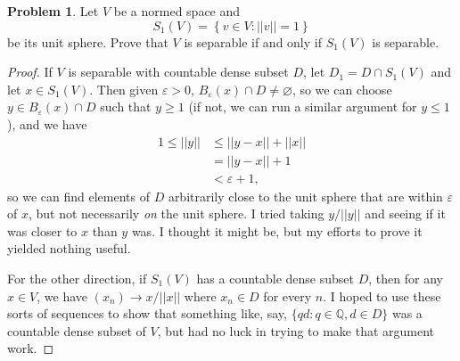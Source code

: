 \documentclass[12pt]{article}
\theoremstyle{definition}
\newtheorem{ex}{Problem}
\begin{document}
\begin{ex}
	Let $V$ be a normed space and \begin{equation*}
		S_1(V) = \left\lbrace v \in V : ||v|| = 1 \right\rbrace
	\end{equation*}
	be its unit sphere.
	Prove that $V$ is separable if and only if $S_1(V)$ is separable.
\end{ex}
\begin{proof}
    If $V$ is separable with countable dense subset $D$, let $D_1 = D \cap S_1(V)$ and let $x \in S_1(V)$.
    Then given $\varepsilon > 0$, $B_\varepsilon(x) \cap D \neq \varnothing$, so we can choose  $y \in B_\varepsilon(x) \cap D$ such that $y \geq 1$ (if not, we can run a similar argument for $y \leq 1$), and we have \begin{align*}
        1 \leq ||y|| & \leq ||y - x|| + ||x|| \\
        & = ||y - x|| + 1 \\
        & < \varepsilon + 1,
    \end{align*}
    so we can find elements of $D$ arbitrarily close to the unit sphere that are within $\varepsilon$ of $x$, but not necessarily \textit{on} the unit sphere.
    I tried taking $y/||y||$ and seeing if it was closer to $x$ than $y$ was.
    I thought it might be, but my efforts to prove it yielded nothing useful.

    For the other direction, if $S_1(V)$ has a countable dense subset $D$, then for any $x \in V$, we have $(x_n)\to x/||x||$ where $x_n \in D$ for every $n$.
    I hoped to use these sorts of sequences to show that something like, say, $\lbrace qd : q \in \mathbb{Q}, d \in D \rbrace$ was a countable dense subset of $V$, but had no luck in trying to make that argument work.
\end{proof}
\end{document}

